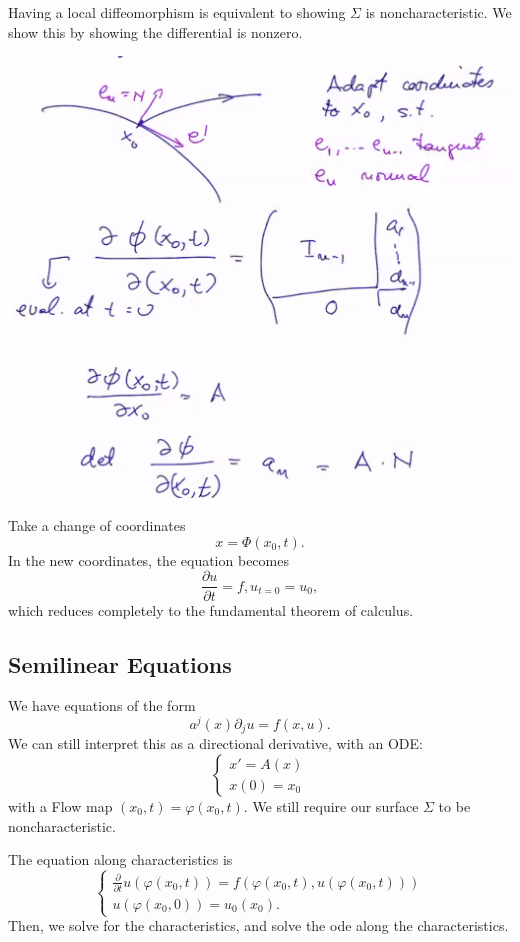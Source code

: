 \documentclass[12pt]{scrartcl}
\let \phi \varphi
\begin{document}
Having a local diffeomorphism is equivalent to showing $\Sigma$ is noncharacteristic.  We show this by showing the differential is nonzero.
 \begin{center}
\includegraphics[scale=0.6]{diffe.png}
\end{center}
Take a change of coordinates 
$$x = \Phi(x_0, t).$$
In the new coordinates, the equation becomes
$$\frac{\partial u}{\partial t} = f, u_{t=0} = u_0,$$
which reduces completely to the fundamental theorem of calculus.
\subsection{Semilinear Equations}
We have equations of the form
$$a^j(x) \partial_j u = f(x, u).$$
We can still interpret this as a directional derivative, with an ODE:
$$\begin{cases}
x' = A(x)\\
x(0) = x_0
\end{cases}$$
with a Flow map $(x_0, t) = \phi(x_0, t)$.  We still require our surface $\Sigma$ to be noncharacteristic.

The equation along characteristics is
$$\begin{cases}
\frac{\partial}{\partial t} u (\phi(x_0, t)) = f(\phi(x_0, t), u(\phi(x_0, t)))\\
u(\phi(x_0, 0)) = u_0(x_0).
\end{cases}
$$
Then, we solve for the characteristics, and solve the ode along the characteristics.  
\end{document}
